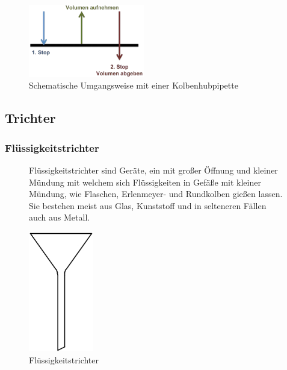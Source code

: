\begin{figure}[h!]
	\centering
	\includegraphics[width=0.45\textwidth]{img/volumen_eppendorf}
	\caption{Schematische Umgangsweise mit einer Kolbenhubpipette}
	\label{fig:eppen_Vol}
\end{figure}
\FloatBarrier

\subsection{Trichter}
\subsubsection*{Flüssigkeitstrichter}
\begin{figure}[h!]
	\begin{minipage}[t]{0.63\textwidth}
		\vspace{0pt}
		Flüssigkeitstrichter sind Geräte, ein mit großer Öffnung und kleiner Mündung mit welchem sich Flüssigkeiten in Gefäße mit kleiner Mündung, wie Flaschen, Erlenmeyer- und Rundkolben gießen lassen. Sie bestehen meist aus Glas, Kunststoff und in selteneren Fällen auch aus Metall.
	\end{minipage}
	\hfill
	\begin{minipage}[t]{0.35\textwidth}
		\vspace{0pt}
		\centering
		\includegraphics[width=0.25\textwidth]{img/trichter}
		\caption{Flüssigkeitstrichter}
		\label{fig:flussigtrichter}
	\end{minipage}
\end{figure}
\FloatBarrier

